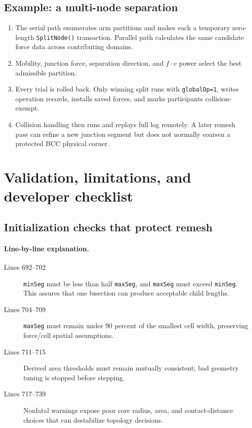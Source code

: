 \documentclass[11pt]{article}
\newcommand{\code}[1]{\texorpdfstring{\nolinkurl{#1}}{#1}}
\begin{document}
\subsection{Example: a multi-node separation}

\begin{enumerate}
\item The serial path enumerates arm partitions and makes each a temporary
zero-length \code{SplitNode()} transaction. Parallel path calculates the same
candidate force data across contributing domains.
\item Mobility, junction force, separation direction, and
\(f\mathbin{\cdot}v\) power select the best admissible partition.
\item Every trial is rolled back. Only winning split runs with
\code{globalOp=1}, writes operation records, installs saved forces, and marks
participants collision-exempt.
\item Collision handling then runs and replays full log remotely. A later
remesh pass can refine a new junction segment but does not normally coarsen a
protected BCC physical corner.
\end{enumerate}

\section{Validation, limitations, and developer checklist}

\subsection{Initialization checks that protect remesh}



\paragraph{Line-by-line explanation.}
\begin{description}
\item[Lines 692--702] \code{minSeg} must be less than half \code{maxSeg}, and
\code{maxSeg} must exceed \code{minSeg}. This assures that one bisection can
produce acceptable child lengths.
\item[Lines 704--709] \code{maxSeg} must remain under 90 percent of the
smallest cell width, preserving force/cell spatial assumptions.
\item[Lines 711--715] Derived area thresholds must remain mutually
consistent; bad geometry tuning is stopped before stepping.
\item[Lines 717--739] Nonfatal warnings expose poor core radius, area, and
contact-distance choices that can destabilize topology decisions.
\end{description}
\end{document}
